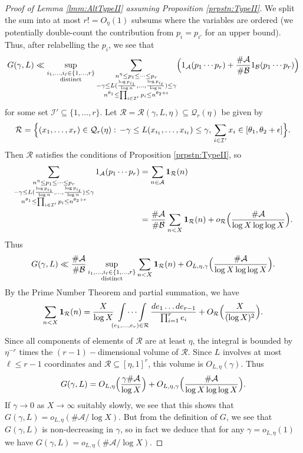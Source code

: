 \documentclass[10pt]{amsart}
\theoremstyle{plain}
\numberwithin{sblmm}{thrm}
\numberwithin{equation}{section}
\begin{document}
\begin{proof}[Proof of Lemma \ref{lmm:AltTypeII} assuming Proposition \ref{prpstn:TypeII}]
We split the sum into at most $r!=O_\eta(1)$ subsums where the variables are ordered (we potentially double-count the contribution from $p_i=p_{i'}$ for an upper bound). Thus, after relabelling the $p_i$, we see that
\[
G(\gamma,L)\ll \sup_{\substack{i_1,\dots,i_\ell\in\{1,\dots,r\}\\ \text{distinct}}}\sum_{\substack{n^{\eta}\le p_1\le \dots\le p_r \\ -\gamma\le L(\frac{\log{p_{i_1}}}{\log{n}},\dots ,\frac{\log{p_{i_\ell}}}{\log{n}})\le \gamma\\ n^{\theta_1}\le\prod_{i\in\mathcal{I}'}p_i\le n^{\theta_2+\epsilon}}}\Bigl(1_{\mathcal{A}}(p_1\cdots p_r)+\frac{\#\mathcal{A}}{\#\mathcal{B}}1_{\mathcal{B}}(p_1\cdots p_r)\Bigr)
\]
for some set $\mathcal{I}'\subseteq\{1,\dots,r\}$. Let $\mathcal{R}=\mathcal{R}(\gamma,L,\eta)\subseteq\mathcal{Q}_{r}(\eta)$ be given by
\[
\mathcal{R}=\Bigl\{(x_1,\dots,x_r)\in \mathcal{Q}_r(\eta):\, -\gamma\le L(x_{i_1},\dots,x_{i_\ell})\le \gamma,\,\sum_{i\in\mathcal{I}'}x_i\in [\theta_1,\theta_2+\epsilon]\Bigr\}.
\]
Then $\mathcal{R}$ satisfies the conditions of Proposition \ref{prpstn:TypeII}, so 
\begin{align*}
\sum_{\substack{n^{\eta}\le p_1\le \dots\le p_r \\ -\gamma\le L(\frac{\log{p_{i_1}}}{\log{n}},\dots ,\frac{\log{p_{i_\ell}}}{\log{n}})\le \gamma\\ n^{\theta_1}\le\prod_{i\in\mathcal{I}'}p_i\le n^{\theta_2+\epsilon}}}1_{\mathcal{A}}(p_1\cdots p_r)&=\sum_{n\in\mathcal{A}}\mathbf{1}_{\mathcal{R}}(n)\\
&=\frac{\#\mathcal{A}}{\#\mathcal{B}}\sum_{n<X}\mathbf{1}_{\mathcal{R}}(n)+o_\mathcal{R}\Bigl(\frac{\#\mathcal{A}}{\log{X}\log\log{X}}\Bigr).
\end{align*}
Thus
\[
G(\gamma,L)\ll  \frac{\#\mathcal{A}}{\#\mathcal{B}}\sup_{\substack{i_1,\dots,i_\ell\in\{1,\dots,r\}\\ \text{distinct}}}\sum_{n<X}\mathbf{1}_{\mathcal{R}}(n)+O_{L,\eta,\gamma}\Bigl(\frac{\#\mathcal{A}}{\log{X}\log\log{X}}\Bigr).
\]
By the Prime Number Theorem and partial summation, we have
\[
\sum_{n<X}\mathbf{1}_{\mathcal{R}}(n)=\frac{X}{\log{X}}\idotsint\limits_{(e_1,\dots,e_r)\in\mathcal{R}}\frac{d e_1\dots d e_{r-1}}{\prod_{i=1}^{r} e_i}+O_{\mathcal{R}}\Bigl(\frac{X}{(\log{X})^2}\Bigr).
\]
Since all components of elements of $\mathcal{R}$ are at least $\eta$, the integral is bounded by $\eta^{-r}$ times the $(r-1)-$dimensional volume of $\mathcal{R}$. Since $L$ involves at most $\ell\le r-1$ coordinates and $\mathcal{R}\subseteq [\eta,1]^r$, this volume is $O_{L,\eta}(\gamma)$.
Thus 
\[
G(\gamma,L)=O_{L,\eta}\Bigl(\frac{\gamma\#\mathcal{A}}{\log{X}}\Bigr)+O_{L,\eta,\gamma}\Bigl(\frac{\#\mathcal{A}}{\log{X}\log\log{X}}\Bigr).
\]
If $\gamma\rightarrow 0$ as $X\rightarrow\infty$ suitably slowly, we see that this shows that $G(\gamma,L)=o_{L,\eta}(\#\mathcal{A}/\log{X})$. But from the definition of $G$, we see that $G(\gamma,L)$ is non-decreasing in $\gamma$, so in fact we deduce that for any $\gamma=o_{L,\eta}(1)$ we have $G(\gamma,L)=o_{L,\eta}(\#\mathcal{A}/\log{X})$.
%
%
%


\end{proof}
\end{document}
